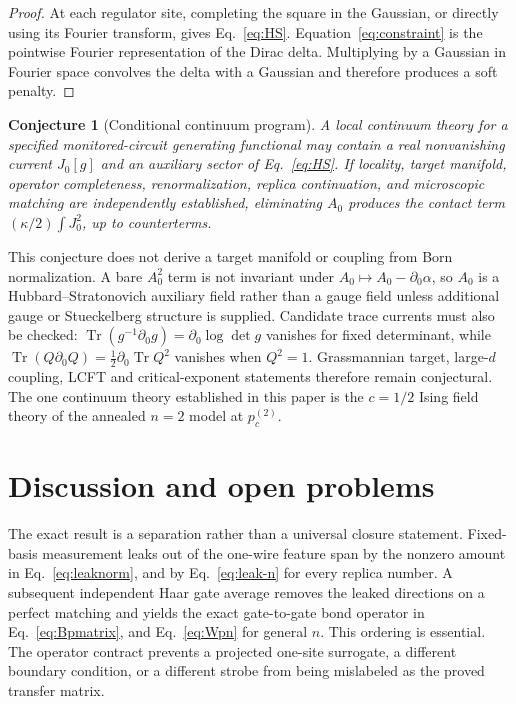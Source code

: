 \documentclass[aps,prx,reprint,superscriptaddress,nobibnotes,longbibliography]{revtex4-2}
\newtheorem{conjecture}{Conjecture}
\theoremstyle{remark}
\newcommand{\Tr}{\operatorname{Tr}}
\begin{document}
\begin{proof}
At each regulator site, completing the square in the Gaussian, or directly using its Fourier transform, gives Eq.~\eqref{eq:HS}.  Equation~\eqref{eq:constraint} is the pointwise Fourier representation of the Dirac delta.  Multiplying by a Gaussian in Fourier space convolves the delta with a Gaussian and therefore produces a soft penalty.
\end{proof}

\begin{conjecture}[Conditional continuum program]
A local continuum theory for a specified monitored-circuit generating functional may contain a real nonvanishing current $J_0[g]$ and an auxiliary sector of Eq.~\eqref{eq:HS}.  If locality, target manifold, operator completeness, renormalization, replica continuation, and microscopic matching are independently established, eliminating $A_0$ produces the contact term $(\kappa/2)\int J_0^2$, up to counterterms.
\end{conjecture}

This conjecture does not derive a target manifold or coupling from Born normalization.  A bare $A_0^2$ term is not invariant under $A_0\mapsto A_0-\partial_0\alpha$, so $A_0$ is a Hubbard--Stratonovich auxiliary field rather than a gauge field unless additional gauge or Stueckelberg structure is supplied.  Candidate trace currents must also be checked: $\Tr(g^{-1}\partial_0g)=\partial_0\log\det g$ vanishes for fixed determinant, while $\Tr(Q\partial_0Q)=\tfrac12\partial_0\Tr Q^2$ vanishes when $Q^2=1$.  Grassmannian target, large-$d$ coupling, LCFT and critical-exponent statements therefore remain conjectural.  The one continuum theory established in this paper is the $c=1/2$ Ising field theory of the annealed $n=2$ model at $p_c^{(2)}$.

\section{Discussion and open problems}

The exact result is a separation rather than a universal closure statement.  Fixed-basis measurement leaks out of the one-wire feature span by the nonzero amount in Eq.~\eqref{eq:leaknorm}, and by Eq.~\eqref{eq:leak-n} for every replica number.  A subsequent independent Haar gate average removes the leaked directions on a perfect matching and yields the exact gate-to-gate bond operator in Eq.~\eqref{eq:Bpmatrix}, and Eq.~\eqref{eq:Wpn} for general $n$.  This ordering is essential.  The operator contract prevents a projected one-site surrogate, a different boundary condition, or a different strobe from being mislabeled as the proved transfer matrix.
\end{document}
